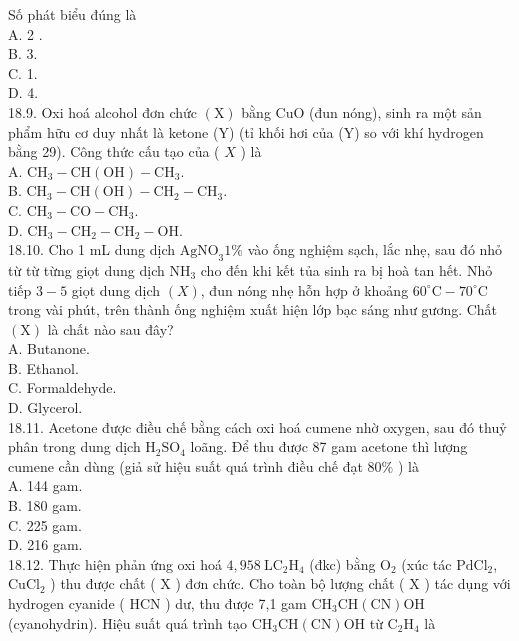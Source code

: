 \documentclass[10pt]{article}
\begin{document}
Số phát biểu đúng là\\
A. 2 .\\
B. 3.\\
C. 1.\\
D. 4.\\
18.9. Oxi hoá alcohol đơn chức $(\mathrm{X})$ bằng CuO (đun nóng), sinh ra một sản phẩm hữu cơ duy nhất là ketone (Y) (tỉ khối hơi của (Y) so với khí hydrogen bằng 29). Công thức cấu tạo của ( $X$ ) là\\
A. $\mathrm{CH}_{3}-\mathrm{CH}(\mathrm{OH})-\mathrm{CH}_{3}$.\\
B. $\mathrm{CH}_{3}-\mathrm{CH}(\mathrm{OH})-\mathrm{CH}_{2}-\mathrm{CH}_{3}$.\\
C. $\mathrm{CH}_{3}-\mathrm{CO}-\mathrm{CH}_{3}$.\\
D. $\mathrm{CH}_{3}-\mathrm{CH}_{2}-\mathrm{CH}_{2}-\mathrm{OH}$.\\
18.10. Cho 1 mL dung dịch $\mathrm{AgNO}_{3} 1 \%$ vào ống nghiệm sạch, lắc nhẹ, sau đó nhỏ từ từ từng giọt dung dịch $\mathrm{NH}_{3}$ cho đến khi kết tủa sinh ra bị hoà tan hết. Nhỏ tiếp $3-5$ giọt dung dịch $(X)$, đun nóng nhẹ hỗn hợp ở khoảng $60^{\circ} \mathrm{C}-70^{\circ} \mathrm{C}$\\
trong vài phút, trên thành ống nghiệm xuất hiện lớp bạc sáng như gương. Chất $(\mathrm{X})$ là chất nào sau đây?\\
A. Butanone.\\
B. Ethanol.\\
C. Formaldehyde.\\
D. Glycerol.\\
18.11. Acetone được điều chế bằng cách oxi hoá cumene nhờ oxygen, sau đó thuỷ phân trong dung dịch $\mathrm{H}_{2} \mathrm{SO}_{4}$ loãng. Để thu được 87 gam acetone thì lượng cumene cần dùng (giả sử hiệu suất quá trình điều chế đạt $80 \%$ ) là\\
A. 144 gam.\\
B. 180 gam.\\
C. 225 gam.\\
D. 216 gam.\\
18.12. Thực hiện phản ứng oxi hoá $4,958 \mathrm{~L} \mathrm{C}_{2} \mathrm{H}_{4}$ (đkc) bằng $\mathrm{O}_{2}$ (xúc tác $\mathrm{PdCl}_{2}$, $\mathrm{CuCl}_{2}$ ) thu được chất ( X ) đơn chức. Cho toàn bộ lượng chất ( X ) tác dụng với hydrogen cyanide ( HCN ) dư, thu được 7,1 gam $\mathrm{CH}_{3} \mathrm{CH}(\mathrm{CN}) \mathrm{OH}$ (cyanohydrin). Hiệu suất quá trình tạo $\mathrm{CH}_{3} \mathrm{CH}(\mathrm{CN}) \mathrm{OH}$ từ $\mathrm{C}_{2} \mathrm{H}_{4}$ là\\
\end{document}
